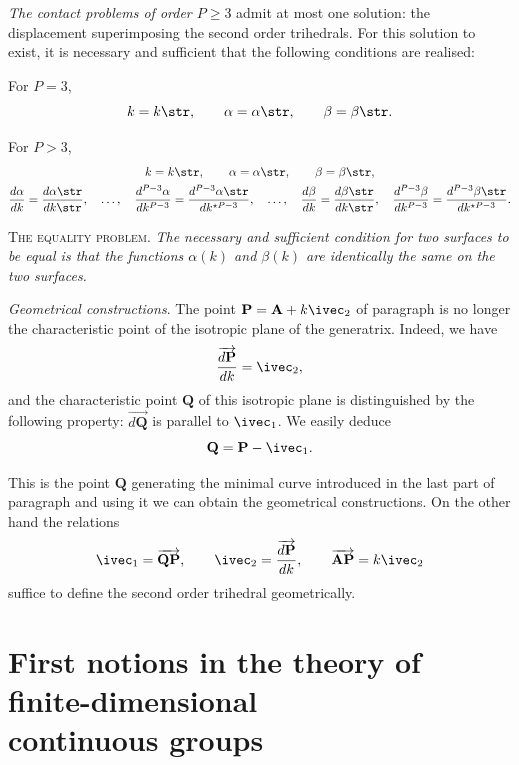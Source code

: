 \emph{The contact problems of order $P\ge 3$} admit at most one solution: the displacement superimposing the second order trihedrals. For this solution to exist, it is necessary and sufficient that the following conditions are realised:

For $P=3$, 
\[
k=k\str,\qquad \alpha=\alpha\str,\qquad\beta=\beta\str.
\]

For $P>3$,
\begin{gather*}
  k=k\str,\qquad \alpha=\alpha\str,\qquad\beta=\beta\str,\\
  \frac{d\alpha}{dk}=\frac{d\alpha\str}{dk\str},\quad\dots,\quad\frac{d^{P-3}\alpha}{dk^{P-3}}=\frac{d^{P-3}\alpha\str}{dk^{\star P-3}},\quad\dots,\quad\frac{d\beta}{dk}=\frac{d\beta\str}{dk\str},\quad\frac{d^{P-3}\beta}{dk^{P-3}}=\frac{d^{P-3}\beta\str}{dk^{\star P-3}}.
\end{gather*}

\somespace

\textsc{The equality problem.} \emph{The necessary and sufficient condition for two surfaces to be equal is that the functions $\alpha(k)$ and $\beta(k)$ are identically the same on the two surfaces.}

\somespace

\emph{Geometrical constructions}. The point $\mathbf{P}=\mathbf{A}+k\ivec_{2}$ of paragraph  is no longer the characteristic point of the isotropic plane of the generatrix. Indeed, we have
\[
\frac{\overrightarrow{d\mathbf{P}}}{dk}=\ivec_{2},
\]
and the characteristic point $\mathbf{Q}$ of this isotropic plane is distinguished by the following property: $\overrightarrow{d\mathbf{Q}}$ is parallel to $\ivec_{1}$. We easily deduce
\[
\mathbf{Q}=\mathbf{P}-\ivec_{1}.
\]

This is the point $\mathbf{Q}$ generating the minimal curve introduced in the last part of paragraph  and using it we can obtain the geometrical constructions. On the other hand the relations
\[
\ivec_{1}=\overrightarrow{\mathbf{QP}},\qquad\ivec_{2}=\frac{\overrightarrow{d\mathbf{P}}}{dk},\qquad\overrightarrow{\mathbf{AP}}=k\ivec_{2}
\]
suffice to define the second order trihedral geometrically.


\part[{First notions in the theory of finite-dimensional continuous groups}]{First notions in the theory of finite-dimensional\\ continuous groups}
\label{part:first-notions-theory}

